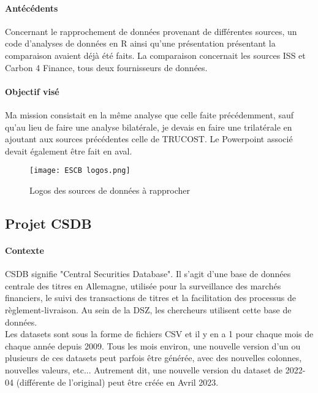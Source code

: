 \paragraph{Antécédents}

Concernant le rapprochement de données provenant de différentes sources, un code d'analyses de données en R ainsi qu'une présentation présentant la comparaison avaient déjà été faits.
La comparaison concernait les sources ISS et Carbon 4 Finance, tous deux fournisseurs de données. 

\paragraph{Objectif visé}

Ma mission consistait en la même analyse que celle faite précédemment, sauf qu'au lieu de faire une analyse bilatérale, je devais en faire une trilatérale en ajoutant aux sources précédentes celle de TRUCOST.
Le Powerpoint associé devait également être fait en aval.

\begin{figure}[H]
    \centering
    \texttt{[image: ESCB logos.png]}
    \caption{Logos des sources de données à rapprocher}
\end{figure}

\pagebreak

\subsection{Projet CSDB}

\paragraph{Contexte}

CSDB signifie "Central Securities Database". Il s'agit d'une base de données centrale des titres en Allemagne, utilisée pour la surveillance des marchés financiers, le suivi des transactions de titres et la facilitation des processus de règlement-livraison.
Au sein de la DSZ, les chercheurs utilisent cette base de données.
\\

Les datasets sont sous la forme de fichiers CSV et il y en a 1 pour chaque mois de chaque année depuis 2009.
Tous les mois environ, une nouvelle version d'un ou plusieurs de ces datasets peut parfois être générée, avec des nouvelles colonnes, nouvelles valeurs, etc...
Autrement dit, une nouvelle version du dataset de 2022-04 (différente de l'original) peut être créée en Avril 2023.

